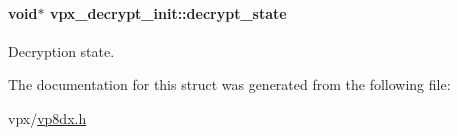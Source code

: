 \paragraph[{\texorpdfstring{decrypt\+\_\+state}{decrypt_state}}]{\setlength{\rightskip}{0pt plus 5cm}void$\ast$ vpx\+\_\+decrypt\+\_\+init\+::decrypt\+\_\+state}\hypertarget{structvpx__decrypt__init_a0a5b356c8cf98a547300abb872092714}{}\label{structvpx__decrypt__init_a0a5b356c8cf98a547300abb872092714}
Decryption state. 

The documentation for this struct was generated from the following file\+:\begin{DoxyCompactItemize}
\item 
vpx/\hyperlink{vp8dx_8h}{vp8dx.\+h}\end{DoxyCompactItemize}
